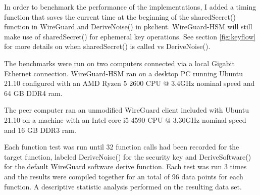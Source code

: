 \documentclass [11pt, proquest] {uwthesis}[2020/02/24]
\begin{document}
In order to benchmark the performance of the implementations, I added a timing function that saves the current time at the beginning of the sharedSecret() function in WireGuard and DeriveNoise() in pkclient. WireGuard-HSM will still make use of sharedSecret() for ephemeral key operations.
See section \ref{fig:keyflow} for more details on when sharedSecret() is called vs DeriveNoise().

The benchmarks were run on two computers connected via a local Gigabit Ethernet connection. 
WireGuard-HSM ran on a desktop PC running Ubuntu 21.10 configured with an AMD Ryzen 5 2600 CPU @ 3.4GHz nominal speed and 64 GB DDR4 ram. 

The peer computer ran an unmodified WireGuard client included with Ubuntu 21.10 on a machine with an Intel core i5-4590 CPU @ 3.30GHz nominal speed and 16 GB DDR3 ram.  

Each function test was run until 32 function calls had been recorded for the target function, labeled DeriveNoise() for the security key and DeriveSoftware() for the default WireGuard software derive function.
Each test was run 3 times and the results were compiled together for an total of 96 data points for each function. A descriptive statistic analysis performed on the resulting data set.
\end{document}
